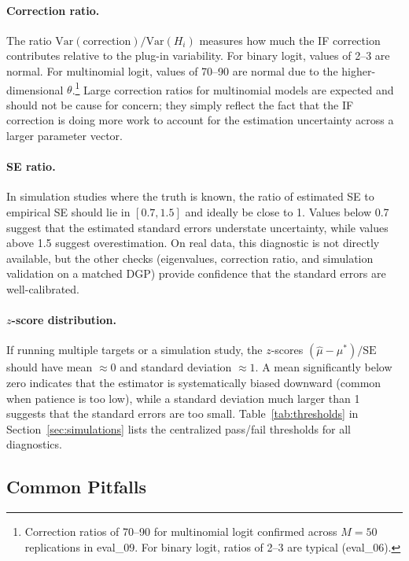 \paragraph{Correction ratio.} The ratio $\mathrm{Var}(\text{correction})/\mathrm{Var}(H_i)$ measures how much the IF correction contributes relative to the plug-in variability. For binary logit, values of 2--3 are normal. For multinomial logit, values of 70--90 are normal due to the higher-dimensional $\theta$.\footnote{Correction ratios of 70--90 for multinomial logit confirmed across $M=50$ replications in eval\_09. For binary logit, ratios of 2--3 are typical (eval\_06).} Large correction ratios for multinomial models are expected and should not be cause for concern; they simply reflect the fact that the IF correction is doing more work to account for the estimation uncertainty across a larger parameter vector.

\paragraph{SE ratio.} In simulation studies where the truth is known, the ratio of estimated SE to empirical SE should lie in $[0.7, 1.5]$ and ideally be close to 1. Values below 0.7 suggest that the estimated standard errors understate uncertainty, while values above 1.5 suggest overestimation. On real data, this diagnostic is not directly available, but the other checks (eigenvalues, correction ratio, and simulation validation on a matched DGP) provide confidence that the standard errors are well-calibrated.

\paragraph{$z$-score distribution.} If running multiple targets or a simulation study, the $z$-scores $(\hat{\mu} - \mu^*)/\mathrm{SE}$ should have mean $\approx 0$ and standard deviation $\approx 1$. A mean significantly below zero indicates that the estimator is systematically biased downward (common when patience is too low), while a standard deviation much larger than 1 suggests that the standard errors are too small. Table~\ref{tab:thresholds} in Section~\ref{sec:simulations} lists the centralized pass/fail thresholds for all diagnostics.

\subsection{Common Pitfalls}\label{sec:pitfalls}


